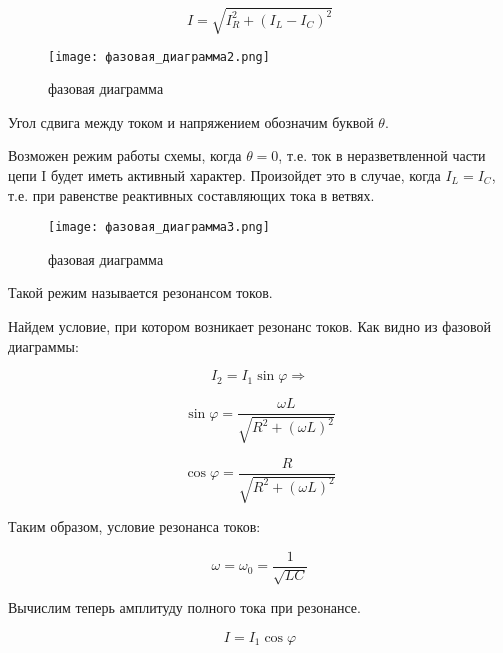     \begin{equation*}
        I = \sqrt{I_R^2 + (I_L - I_C)^2}
    \end{equation*}

    \begin{figure}[h!]
        \centering
        \texttt{[image: фазовая\_диаграмма2.png]}
        \caption{фазовая диаграмма}
    \end{figure}

    \noindent Угол сдвига между током и напряжением обозначим буквой $\theta$.

    \noindent Возможен режим работы схемы, когда $\theta = 0$, 
    т.е. ток в неразветвленной части цепи I будет иметь активный характер. 
    Произойдет это в случае, когда $I_L = I_C$, 
    т.е. при равенстве реактивных составляющих тока в ветвях.

    \begin{figure}[h!]
        \centering
        \texttt{[image: фазовая\_диаграмма3.png]}
        \caption{фазовая диаграмма}
    \end{figure}

    \noindent Такой режим называется резонансом токов.

    \noindent Найдем условие, при котором возникает резонанс токов.
    Как видно из фазовой диаграммы:

    \begin{equation*}
        I_2 = I_1 \sin \varphi \Rightarrow
    \end{equation*}

    \begin{equation*}
        \sin \varphi = \frac{\omega L}{\sqrt{R^2 + (\omega L)^2}}
    \end{equation*}

    \begin{equation*}
        \cos \varphi = \frac{R}{\sqrt{R^2 + (\omega L)^2}}
    \end{equation*}

    Таким образом, условие резонанса токов:

    \begin{equation*}
        \omega = \omega_0 = \frac{1}{\sqrt{LC}}
    \end{equation*}

    Вычислим теперь амплитуду полного тока при резонансе.

    \begin{equation*}
        I = I_1 \cos \varphi
    \end{equation*}

